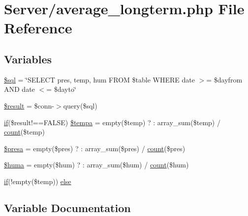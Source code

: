 \hypertarget{average__longterm_8php}{}\section{Server/average\+\_\+longterm.php File Reference}
\label{average__longterm_8php}
\subsection*{Variables}
\begin{DoxyCompactItemize}
\item 
\hyperlink{average__longterm_8php_a047170d6020a882807665812a27e2525}{\$sql} = \char`\"{}S\+E\+L\+E\+CT pres, temp, hum F\+R\+OM \$table W\+H\+E\+RE date $>$= \textquotesingle{}\$dayfrom\textquotesingle{} A\+ND date $<$= \textquotesingle{}\$dayto\textquotesingle{}\char`\"{}
\item 
\hyperlink{average__longterm_8php_a112ef069ddc0454086e3d1e6d8d55d07}{\$result} = \$conn-\/$>$query(\$sql)
\item 
\hyperlink{index_8php_a5bd83a7a52ff3be468b16a8c82e43673}{if}(\$result!==F\+A\+L\+SE) \hyperlink{average__longterm_8php_a8923948fae95ff6dc6ed7e7df3446854}{\$tempa} = empty(\$temp) ? \textquotesingle{}\textquotesingle{} \+: array\+\_\+sum(\$temp) / \hyperlink{_w_s_8ino_ad43c3812e6d13e0518d9f8b8f463ffcf}{count}(\$temp)
\item 
\hyperlink{average__longterm_8php_a2b0df464a962196e7245f2c46057ba1a}{\$presa} = empty(\$pres) ? \textquotesingle{}\textquotesingle{} \+: array\+\_\+sum(\$pres) / \hyperlink{_w_s_8ino_ad43c3812e6d13e0518d9f8b8f463ffcf}{count}(\$pres)
\item 
\hyperlink{average__longterm_8php_a29dc8b646ccc31d3f81aa1a74581e018}{\$huma} = empty(\$hum) ? \textquotesingle{}\textquotesingle{} \+: array\+\_\+sum(\$hum) / \hyperlink{_w_s_8ino_ad43c3812e6d13e0518d9f8b8f463ffcf}{count}(\$hum)
\item 
\hyperlink{index_8php_a5bd83a7a52ff3be468b16a8c82e43673}{if}(!empty(\$temp)) \hyperlink{average__longterm_8php_a5e911e6d95c6980d50f6cba065d73dc1}{else}
\end{DoxyCompactItemize}


\subsection{Variable Documentation}
\mbox{\label{average__longterm_8php_a29dc8b646ccc31d3f81aa1a74581e018}} 
